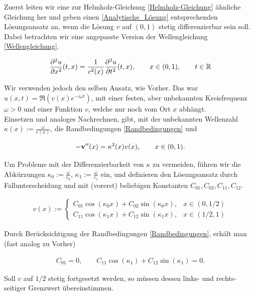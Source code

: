 Zuerst leiten wir eine zur Helmholz-Gleichung \eqref{Helmholz-Gleichung} ähnliche Gleichung her und geben einen \eqref{Analytische_Lösung} entsprechenden Lösungsansatz an, wenn die Lösung $v$ auf $(0, 1)$ stetig differenzierbar sein soll.
Dabei betrachten wir eine angepasste Version der Wellengleichung \eqref{Wellengleichung}.

\begin{align*}
  \frac{\partial^2 u}{\partial x^2} (t, x) =
  \frac{1}{c^2(x)}
  \frac{\partial^2 u}{\partial t^2} (t, x), \qquad
  x \in (0, 1), \qquad
  t \in \mathbb{R}
\end{align*}

Wir verwenden jedoch den selben Ansatz, wie Vorher. Das war $u(x, t) = \Re (v(x) e^{-i \omega t})$, mit einer festen, aber unbekannten Kreisfrequenz $\omega > 0$ und einer Funktion $v$, welche nur noch vom Ort $x$ abhängt. \\

Einsetzen und analoges Nachrechnen, gibt, mit der unbekannten Wellenzahl $\kappa(x) := \frac{\omega}{c(x)}$, die Randbedingungen \eqref{Randbedingungen} und

\begin{align*}
  -\mathbf{v}^{\prime \prime}(x) = \kappa^2(x) v(x), \qquad
  x \in (0, 1).
\end{align*}

Um Probleme mit der Differenzierbarkeit von $\kappa$ zu vermeiden, führen wir die Abkürzungen $\kappa_0 := \frac{\omega}{c_0}$, $\kappa_1 := \frac{\omega}{c_1}$ ein, und definieren den Lösungsansatz durch Fallunterscheidung und mit (vorerst) beliebigen Konstanten $C_{01}, C_{02}, C_{11}, C_{12}$.

\begin{align*}
  v(x) :=
  \begin{cases}
    C_{01} \cos{(\kappa_0 x)} + C_{02} \sin{(\kappa_0 x)},
    & x \in (0, 1/2) \\
    C_{11} \cos{(\kappa_1 x)} + C_{12} \sin{(\kappa_1 x)},
    & x \in (1/2, 1)
  \end{cases}
\end{align*}

Durch Berücksichtigung der Randbedingungen \eqref{Randbedingungen}, erhält man (fast analog zu Vorher)

\begin{align*}
  C_{01} = 0, \qquad
  C_{11} \cos{(\kappa_1)} + C_{12} \sin{(\kappa_1)} = 0.
\end{align*}

Soll $v$ auf $1/2$ stetig fortgesetzt werden, so müssen dessen links- und rechts-seitiger Grenzwert übereinstimmen.

